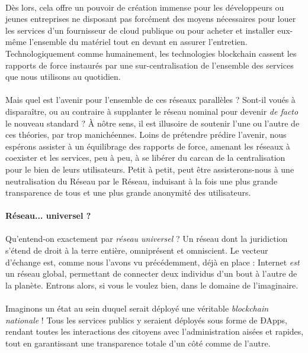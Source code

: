 \paragraph{} Dès lors, cela offre un pouvoir de création immense pour les développeurs ou jeunes entreprises ne disposant 
pas forcément des moyens nécessaires pour louer les services d'un fournisseur de cloud publique ou pour acheter et installer
eux-même l'ensemble du matériel tout en devant en assurer l'entretien. Technologiquement comme humainement, les technologies
blockchain cassent les rapports de force instaurés par une sur-centralisation de l'ensemble des services que nous utilisons
au quotidien.

\paragraph{} Mais quel est l'avenir pour l'ensemble de ces réseaux parallèles ? Sont-il voués à disparaître, ou au contraire
à supplanter le réseau nominal pour devenir \emph{de facto} le nouveau standard ? À nôtre sens, il est illusoire de soutenir
l'une ou l'autre de ces théories, par trop manichéennes. Loins de prétendre prédire l'avenir, nous espérons assister à un 
équilibrage des rapports de force, amenant les réseaux à coexister et les services, peu à peu, à se libérer du carcan de la
centralisation pour le bien de leurs utilisateurs. Petit à petit, peut être assisterons-nous à une neutralisation du Réseau
par le Réseau, induisant à la fois une plus grande transparence de tous et une plus grande anonymité des utilisateurs.


\paragraph{Réseau... universel ?}

\paragraph{} Qu'entend-on exactement par \emph{réseau universel} ? Un réseau \guillemotleft dont la juridiction s'étend de
droit à la terre entière\guillemotright \cite{Universel0}, omniprésent et omniscient. Le vecteur d'échange est, comme nous 
l'avons vu précédemment, déjà en place : Internet \emph{est} un réseau global, permettant de connecter deux individus d'un 
bout à l'autre de la planète. Entrons alors, si vous le voulez bien, dans le domaine de l'imaginaire.

\paragraph{} Imaginons un état au sein duquel serait déployé une véritable \emph{blockchain nationale} ! Tous les services
publics y seraient déployés sous forme de ÐApps, rendant toutes les interactions des citoyens avec l'administration aisées
et rapides, tout en garantissant une transparence totale d'un côté comme de l'autre. 

